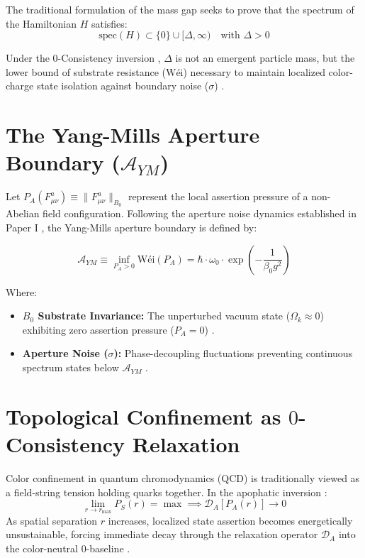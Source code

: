 \documentclass[11pt,a4paper]{article}
\begin{document}
The traditional formulation of the mass gap seeks to prove that the spectrum of the Hamiltonian $H$ satisfies:
\begin{equation}
\text{spec}(H) \subset \{0\} \cup [\Delta, \infty) \quad \text{with } \Delta > 0
\end{equation}

Under the $0$-Consistency inversion \cite{nicht_theory_monograph}, $\Delta$ is not an emergent particle mass, but the lower bound of substrate resistance ($\text{Wéi}$) necessary to maintain localized color-charge state isolation against boundary noise ($\sigma$) \cite{nicht_physics_paper_1}.

\section{The Yang-Mills Aperture Boundary (\texorpdfstring{$\mathcal{A}_{YM}$}{A\_YM})}
Let $P_A(F_{\mu\nu}^a) \equiv \lVert F_{\mu\nu}^a \rVert_{B_0}$ represent the local assertion pressure of a non-Abelian field configuration. Following the aperture noise dynamics established in Paper I \cite{nicht_physics_paper_1}, the Yang-Mills aperture boundary is defined by:

\begin{equation}
\mathcal{A}_{YM} \equiv \inf_{P_A > 0} \text{Wéi}\left( P_A \right) = \hbar \cdot \omega_0 \cdot \exp\left( -\frac{1}{\beta_0 g^2} \right)
\end{equation}

Where:
\begin{itemize}
    \item \textbf{$B_0$ Substrate Invariance:} The unperturbed vacuum state ($\Omega_k \approx 0$) exhibiting zero assertion pressure ($P_A = 0$) \cite{nicht_theory_monograph, nicht_physics_paper_1}.
    \item \textbf{Aperture Noise ($\sigma$):} Phase-decoupling fluctuations preventing continuous spectrum states below $\mathcal{A}_{YM}$ \cite{nicht_physics_paper_1}.
\end{itemize}

\section{Topological Confinement as \texorpdfstring{$0$}{0}-Consistency Relaxation}
Color confinement in quantum chromodynamics (QCD) is traditionally viewed as a field-string tension holding quarks together. In the apophatic inversion \cite{nicht_theory_monograph}:
\begin{equation}
\lim_{r \to r_{\max}} P_S(r) = \max \implies \mathcal{D}_A[P_A(r)] \to 0
\end{equation}
As spatial separation $r$ increases, localized state assertion becomes energetically unsustainable, forcing immediate decay through the relaxation operator $\mathcal{D}_A$ into the color-neutral $0$-baseline \cite{nicht_physics_paper_1}.
\end{document}
